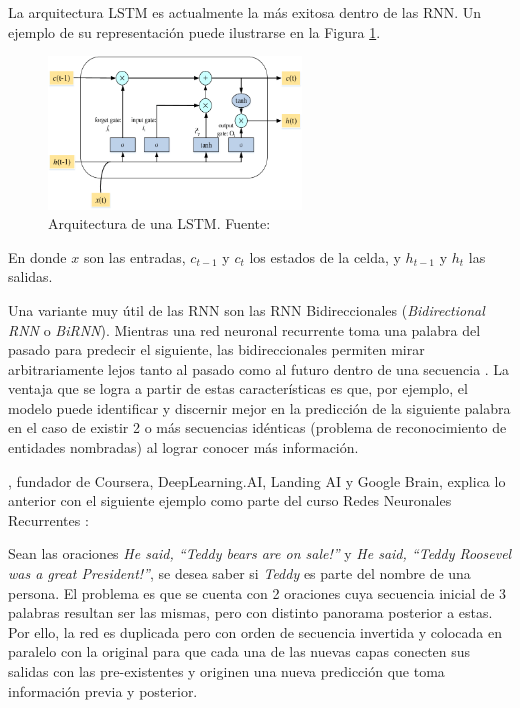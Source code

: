 \begin{itemize}
\begin{itemize}
		La arquitectura LSTM es actualmente la más exitosa dentro de las RNN. Un ejemplo de su representación puede ilustrarse en la Figura \ref{2:fig42}.
		
		\begin{figure}[!ht]
			\begin{center}
				\includegraphics[width=0.6\textwidth]{2/figures/lstm.png}
				\caption{Arquitectura de una LSTM. Fuente: \cite{tec_yuan2019lstm}}
				\label{2:fig42}
			\end{center}
		\end{figure}
	
		En donde $x$ son las entradas, $c_{t-1}$ y $c_{t}$ los estados de la celda, y $h_{t-1}$ y $h_{t}$  las salidas.
		
		Una variante muy útil de las RNN son las RNN Bidireccionales (\textit{Bidirectional RNN} o \textit{BiRNN}). Mientras una red neuronal recurrente toma una palabra del pasado para predecir el siguiente, las bidireccionales permiten mirar arbitrariamente lejos tanto al pasado como al futuro dentro de una secuencia \parencite{bk_goldberg2017nn_nlp}.
		La ventaja que se logra a partir de estas características es que, por ejemplo, el modelo puede identificar y discernir mejor en la predicción de la siguiente palabra en el caso de existir 2 o más secuencias idénticas (problema de reconocimiento de entidades nombradas) al lograr conocer más información.
		
		\citeauthor{tec_ng2018bidirectionalRNN}, fundador de Coursera, DeepLearning.AI, Landing AI y Google Brain, explica lo anterior con el siguiente ejemplo como parte del curso Redes Neuronales Recurrentes \parencite{tec_ng2018bidirectionalRNN}:
		
		Sean las oraciones \textit{He said, “Teddy bears are on sale!”} y \textit{He said, “Teddy Roosevel was a great President!”}, se desea saber si \textit{Teddy} es parte del nombre de una persona. El problema es que se cuenta con 2 oraciones cuya secuencia inicial de 3 palabras resultan ser las mismas, pero con distinto panorama posterior a estas. Por ello, la red es duplicada pero con orden de secuencia invertida y colocada en paralelo con la original para que cada una de las nuevas capas conecten sus salidas con las pre-existentes y originen una nueva predicción que toma información previa y posterior.
		

\end{itemize}
\end{itemize}
